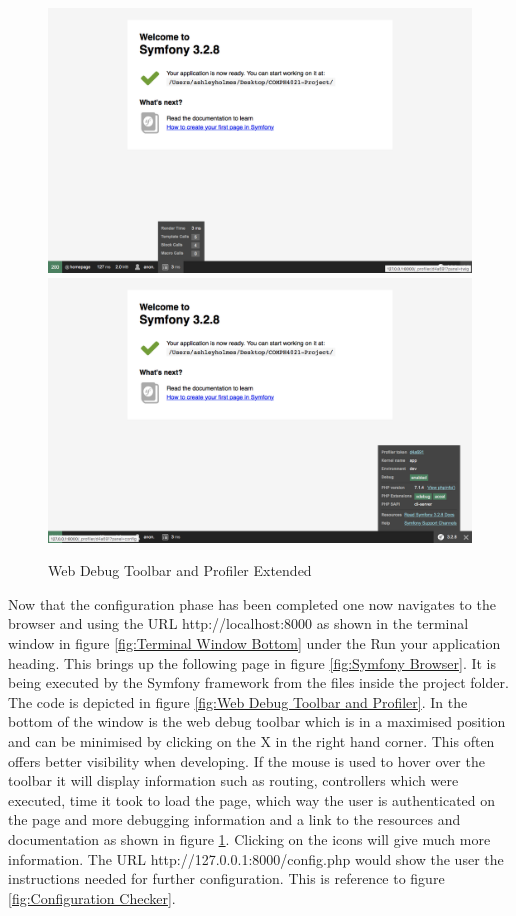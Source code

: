\begin{figure}[htbp]
   \centering
   \includegraphics[width=400pt]{figures/webdebug_5.png}
   \includegraphics[width=400pt]{figures/webdebug_6.png} %
   \caption{Web Debug Toolbar and Profiler Extended}
   \label{fig:Web Debug Toolbar and Profiler Extended}
\end{figure}

Now that the configuration phase has been completed one now navigates to the browser and using the URL http://localhost:8000 as shown in the terminal window in figure \ref{fig:Terminal Window Bottom} under the Run your application heading. This brings up the following page in figure \ref{fig:Symfony Browser}. It is being executed by the Symfony framework from the files inside the project folder. The code is depicted in figure \ref{fig:Web Debug Toolbar and Profiler}. In the bottom of the window is the web debug toolbar which is in a maximised position and can be minimised by clicking on the X in the right hand corner. This often offers better visibility when developing. If the mouse is used to hover over the toolbar it will display information such as routing, controllers which were executed, time it took to load the page, which way the user is authenticated on the page and more debugging information and a link to the resources and documentation as shown in figure \ref{fig:Web Debug Toolbar and Profiler Extended}. Clicking on the icons will give much more information. The URL http://127.0.0.1:8000/config.php would show the user the instructions needed for further configuration. This is reference to figure \ref{fig:Configuration Checker}.


